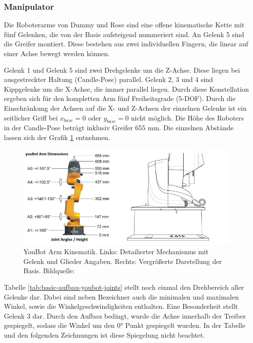 \subsubsection{Manipulator}
 Die Roboterarme von Dummy und Rose sind eine offene kinematische Kette mit fünf Gelenken, die von der Basis aufsteigend nummeriert sind. An Gelenk 5 sind die Greifer montiert. Diese bestehen aus zwei individuellen Fingern, die linear auf einer Achse bewegt werden können.

Gelenk 1 und Gelenk 5 sind zwei Drehgelenke um die Z-Achse. Diese liegen bei ausgestreckter Haltung (Candle-Pose) parallel. Gelenk 2, 3 und 4 sind Kippgelenke um die X-Achse, die immer parallel liegen. Durch diese Konstellation ergeben sich für den kompletten Arm fünf Freiheitsgrade (5-DOF). Durch die Einschränkung der Achsen auf die X- und Z-Achsen der einzelnen Gelenke ist ein seitlicher Griff bei $x_{base} = 0$ oder $y_{base} = 0$ nicht möglich. Die Höhe des Roboters in der Candle-Pose beträgt inklusiv Greifer 655 mm. Die einzelnen Abstände lassen sich der Grafik \ref{fig:basic-aufbau-youbot-kinematik} entnehmen.

\begin{figure}[H]
	\centering
	\includegraphics[scale=0.8]{fig/kukaarm_1}   
	\caption[YouBot Arm Kinematik]{YouBot Arm Kinematik. Links: Detailierter Mechanismus mit Gelenk und Glieder Angaben. Rechts: Vergrößerte Darstellung der Basis. Bildquelle: \cite{monikaflorekjasinska2015}}
	\label{fig:basic-aufbau-youbot-kinematik}
\end{figure}



 
 Tabelle \ref{tab:basic-aufbau-youbot-joints} stellt noch einmal den Drehbereich aller Gelenke dar. Dabei sind neben Bezeichner auch die minimalen und maximalen Winkel, sowie die Winkelgeschwindigkeiten enthalten. Eine Besonderheit stellt Gelenk 3 dar. Durch den Aufbau bedingt, wurde die Achse innerhalb der Treiber gespiegelt, sodass die Winkel um den 0° Punkt gespiegelt wurden. In der Tabelle und den folgenden Zeichnungen ist diese Spiegelung nicht beachtet.
 
